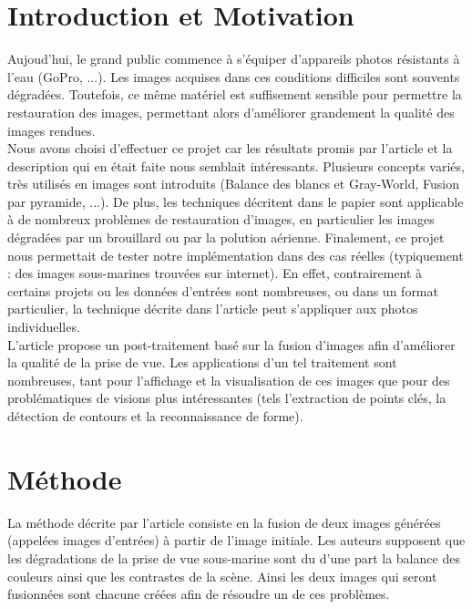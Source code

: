 \documentclass[twoside]{article}
\begin{document}
\begin{multicols}{2} %

\section{Introduction et Motivation}
Aujoud'hui, le grand public commence à s'équiper d'appareils photos résistants à l'eau (GoPro, ...). Les images acquises dans ces conditions difficiles sont souvents dégradées. Toutefois, ce même matériel est suffisement sensible pour permettre la restauration des images, permettant alors d'améliorer grandement la qualité des images rendues.\\
Nous avons choisi d'effectuer ce projet car les résultats promis par l'article et la description qui en était faite nous semblait intéressants. Plusieurs concepts variés, très utilisés en images sont introduits (Balance des blancs et Gray-World, Fusion par pyramide, ...). De plus, les techniques décritent dans le papier sont applicable à de nombreux problèmes de restauration d'images, en particulier les images dégradées par un brouillard ou par la polution aérienne. Finalement, ce projet nous permettait de tester notre implémentation dans des cas réelles (typiquement : des images sous-marines trouvées sur internet). En effet, contrairement à certains projets ou les données d'entrées sont nombreuses, ou dans un format particulier, la technique décrite dans l'article peut s'appliquer aux photos individuelles.\\
L’article propose un post-traitement basé sur la fusion d’images afin d’améliorer la qualité de la prise de vue. Les applications d’un tel traitement sont nombreuses, tant pour l’affichage et la visualisation de ces images que pour des problématiques de visions plus intéressantes (tels l’extraction de points clés, la détection de contours et la reconnaissance de forme).\\


\section{Méthode}

La méthode décrite par l’article consiste en la fusion de deux images générées (appelées images d'entrées) à partir de l’image initiale. Les auteurs supposent que les dégradations de la prise de vue sous-marine sont du d’une part la balance des couleurs ainsi que les contrastes de la scène. Ainsi les deux images qui seront fusionnées sont chacune créées afin de résoudre un de ces problèmes.\\


\end{multicols}
\end{document}

